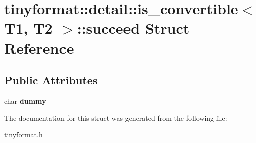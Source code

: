 \hypertarget{structtinyformat_1_1detail_1_1is__convertible_1_1succeed}{}\section{tinyformat\+:\+:detail\+:\+:is\+\_\+convertible$<$ T1, T2 $>$\+:\+:succeed Struct Reference}
\label{structtinyformat_1_1detail_1_1is__convertible_1_1succeed}
\subsection*{Public Attributes}
\begin{DoxyCompactItemize}
\item 
\mbox{\label{structtinyformat_1_1detail_1_1is__convertible_1_1succeed_a7f25789e5f4b4d4fbc8999f9f096cbf6}} 
char {\bfseries dummy}
\end{DoxyCompactItemize}


The documentation for this struct was generated from the following file\+:\begin{DoxyCompactItemize}
\item 
tinyformat.\+h\end{DoxyCompactItemize}
